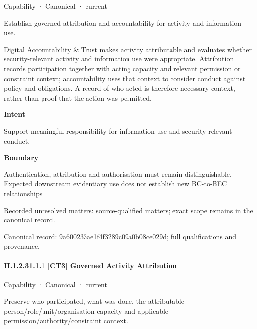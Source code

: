 \label{element:9a600233ae1f4f3289c09a0b08ce029d}
{\small Capability · Canonical · current}\par

Establish governed attribution and accountability for activity and information use.



Digital Accountability \& Trust makes activity attributable and evaluates whether security-relevant activity and information use were appropriate. Attribution records participation together with acting capacity and relevant permission or constraint context; accountability uses that context to consider conduct against policy and obligations. A record of who acted is therefore necessary context, rather than proof that the action was permitted.



\textbf{Intent}



Support meaningful responsibility for information use and security-relevant conduct.



\textbf{Boundary}



Authentication, attribution and authorisation must remain distinguishable. Expected downstream evidentiary use does not establish new BC-to-BEC relationships.


{\small Recorded unresolved matters: source-qualified matters; exact scope remains in the canonical record.}\par
{\footnotesize \href{../../../../continuum/strategy/capability/9a600233ae1f4f3289c09a0b08ce029d.md}{Canonical record: 9a600233ae1f4f3289c09a0b08ce029d}; full qualifications and provenance.}\par
\paragraph*{II.1.2.31.1.1 [CT3] Governed Activity Attribution}
\label{navigation:II.1.2.31.1.1}

\label{element:646b3fd80a8b4f269691db7942e0f809}
{\small Capability · Canonical · current}\par

Preserve who participated, what was done, the attributable person/role/unit/organisation capacity and applicable permission/authority/constraint context.



